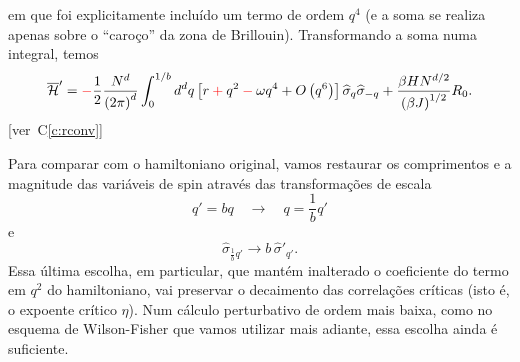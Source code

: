 \documentclass[12pt,a4paper]{article}
\newcommand{\Hb}{\overline{\mathcal{H}}}
\newcommand{\sh}{\widehat{\sigma}}
\newcommand{\corr}[1]{\textcolor{red}{#1}}
\newcommand{\cmais}{\mathbin{\textcolor{red}{+}}}
\newcommand{\cmenos}{\mathbin{\textcolor{red}{-}}}
\newcounter{corr}
\newcommand{\ver}[1]{{\color{red}\small[ver~C\ref{#1}]}}
\begin{document}
\medskip

\noindent em que foi explicitamente incluído um termo de ordem $q^4$ (e a soma se realiza
apenas sobre o ``caroço'' da zona de Brillouin). Transformando a soma numa
integral, temos
\begin{equation}
\Hb'=\corr{-}\frac12\frac{N^d}{\left(2\pi\right)^d}\int_0^{1/b}d^dq\left[r\cmais q^2\cmenos\omega q^4+O\left(q^6\right)\right]\sh_q\sh_{-q}
+\frac{\beta HN^{d/2}}{\left(\beta J\right)^{1/2}}R_0.
\end{equation}
\ver{c:rconv}

Para comparar com o hamiltoniano original, vamos restaurar os
comprimentos e a magnitude das variáveis de spin através das transformações de
escala
\begin{equation}
q'=bq\quad\to\quad q=\frac1bq'
\end{equation}
e
\begin{equation}
\sh_{\frac1bq'}\to b\,\sh'_{q'}.
\end{equation}
Essa última escolha, em particular, que mantém inalterado o coeficiente do
termo em $q^2$ do hamiltoniano, vai preservar o decaimento das correlações
críticas (isto é, o expoente crítico $\eta$). Num cálculo perturbativo de ordem
mais baixa, como no esquema de Wilson-Fisher que vamos utilizar mais
adiante, essa escolha ainda é suficiente.
\end{document}
